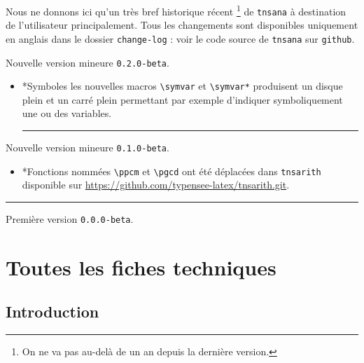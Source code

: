 \documentclass[12pt,a4paper]{article}
\makeatletter
\newcommand\env[1]{\texttt{#1}}
\newcommand\macro[1]{\env{\textbackslash{}#1}}
\theoremstyle{definition}
\newcommand\separation{
	\medskip
	\hfill\rule{0.5\textwidth}{0.75pt}\hfill
	\medskip
}
\newcommand\topic{\@ifstar{\@topic@star}{\@topic@no@star}}
\newcommand\@topic@no@star[1]{%
	\textbf{\textsc{#1}.}%
}
\newcommand\@topic@star[1]{%
	\textbf{\textsc{#1} :}%
}
\makeatother
\begin{document}
Nous ne donnons ici qu'un très bref historique récent
\footnote{
	On ne va pas au-delà de un an depuis la dernière version.
}
de \verb+tnsana+ à destination de l'utilisateur principalement.
Tous les changements sont disponibles uniquement en anglais dans le dossier \verb+change-log+ : voir le code source de \verb+tnsana+ sur \verb+github+.

\begin{description}

    \medskip
    \item[2020-07-15] Nouvelle version mineure \verb+0.2.0-beta+.
    
    \begin{itemize}[itemsep=.5em]
        \item \topic*{Symboles} les nouvelles macros \macro{symvar} et \macro{symvar*} produisent un disque plein et un carré plein permettant par exemple d'indiquer symboliquement une ou des variables.
        
        \separation
    \end{itemize}

    \medskip
    \item[2020-07-12] Nouvelle version mineure \verb+0.1.0-beta+. 
        
    \begin{itemize}[itemsep=.5em]
        \item \topic*{Fonctions nommées} \macro{ppcm} et \macro{pgcd} ont été déplacées dans \texttt{tnsarith} disponible sur \url{https://github.com/typensee-latex/tnsarith.git}.
    \end{itemize}
    
    
    \separation

    \medskip
    \item[2020-07-10] Première version \verb+0.0.0-beta+.


\end{description}


\newpage
\section{Toutes les fiches techniques} \label{techincal-ids}

\subsection{Introduction}
\end{document}
